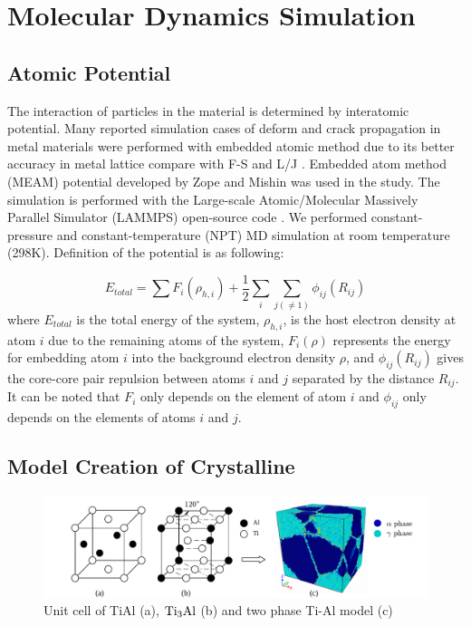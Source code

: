\documentclass[materials,article,submit,moreauthors,pdftex,10pt,a4paper]{Definitions/mdpi}
\begin{document}
\section{Molecular Dynamics Simulation }\label{section:method}
\subsection{Atomic Potential}

The interaction of particles in the material is determined by interatomic potential. Many reported simulation cases of deform and crack propagation in metal materials were performed with embedded atomic method due to its better accuracy in metal lattice compare with F-S and L/J \cite{Ko2015,Zepeda-Ruiz2017,Fan2018a}. Embedded atom method (MEAM) potential developed by Zope and Mishin \cite{Zope2003} was used in the study. The simulation is performed  with the Large-scale Atomic/Molecular Massively Parallel Simulator (LAMMPS) open-source code \cite{Plimpton1995}. We performed constant-pressure and constant-temperature (NPT) MD simulation at room temperature (298K). Definition of the potential is as following:
	
\begin{equation} \label{eq:eam} 
E_{total}= \displaystyle\sum F_i(\rho_{h,i})+\frac{1}{2}\sum_i\sum_{j(\neq1)}\phi_{ij}(R_{ij})
\end{equation}
where $E_{total}$ is the total energy of the system, $\rho_{h,i}$, is the host electron density at atom $i$ due to the remaining atoms of the system, $F_i(\rho)$ represents the energy for embedding atom $i$ into the background electron density $\rho$, and $\phi_{ij}(R_{ij})$ gives the core-core pair repulsion between atoms $i$ and $j$ separated by the distance $R_{ij}$. It can be noted that $F_i$ only depends on the element of atom $i$ and $\phi_{ij}$ only depends on the elements of atoms $i$ and $j$. 

\subsection{Model Creation of Crystalline}
\begin{figure}[ht]
	\centering
	\includegraphics[width=1\linewidth]{img/modeling}
	\caption{Unit cell of \rm{TiAl} (a), $\rm{Ti_3Al}$ (b) and two phase Ti-Al model (c)}
	\label{fig:tial-cell}
\end{figure}
\end{document}
